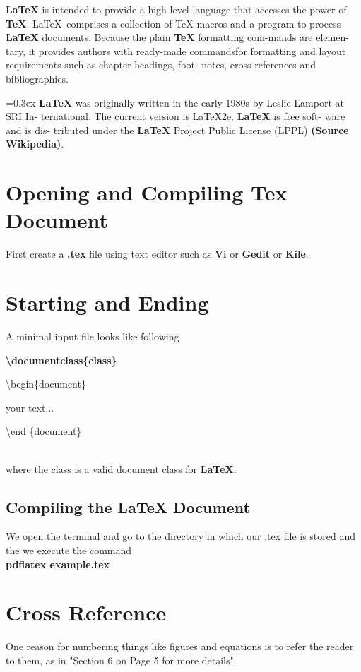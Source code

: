 \documentclass[12pt]{article}
\begin{document}
\textbf{LaTeX} is intended to provide a high-level language that accesses the power
of \textbf{TeX}. \LaTeX\ comprises a collection of TeX macros and a program to process
\textbf{LaTeX} documents. Because the plain \textbf{TeX} formatting com-mands are elemen-
tary, it provides authors with ready-made commands\newpage for formatting and layout requirements such as chapter headings, foot-
notes, cross-references and bibliographies.

\font=0.3ex
\textbf{LaTeX} was originally written in the early 1980s by Leslie Lamport at SRI In-
ternational. The current version is LaTeX2e. \textbf{LaTeX} is free soft- ware and is dis-
tributed under the \textbf{LaTeX} Project Public License (LPPL) \textbf{(Source Wikipedia)}.

\section{Opening and Compiling Tex Document}\label{sec_open}
First create a \textbf{.tex} file using text editor such as \textbf{Vi} or \textbf{Gedit} or \textbf{Kile}.

\section{Starting and Ending}\label{sec_startend}
A minimal input file looks like following

\vspace{1cm}
{\bfseries \textbackslash documentclass\{class\} \par 
\textbackslash begin\{document\}\par
\hspace{0.8cm} your text... \par
\textbackslash end \{document\}}\\
\noindent
where the class is a valid document class for \textbf{LaTeX}.
\subsection{Compiling the LaTeX Document}
We open the terminal and go to the directory in which our .tex file is stored
and the we execute the command\\

\textbf{pdflatex example.tex} \newpage

\section{Cross Reference}\label{sec_crossref}
One reason for numbering things like figures and equations is to refer the
reader to them, as in "Section 6 on Page 5 for more details".
\end{document}
